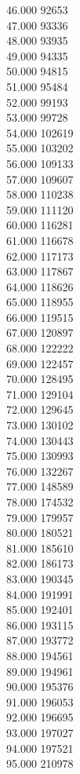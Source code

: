 { 46.000	92653 \\
 47.000	93336 \\
 48.000	93935 \\
 49.000	94335 \\
 50.000	94815 \\
 51.000	95484 \\
 52.000	99193 \\
 53.000	99728 \\
 54.000	102619 \\
 55.000	103202 \\
 56.000	109133 \\
 57.000	109607 \\
 58.000	110238 \\
 59.000	111120 \\
 60.000	116281 \\
 61.000	116678 \\
 62.000	117173 \\
 63.000	117867 \\
 64.000	118626 \\
 65.000	118955 \\
 66.000	119515 \\
 67.000	120897 \\
 68.000	122222 \\
 69.000	122457 \\
 70.000	128495 \\
 71.000	129104 \\
 72.000	129645 \\
 73.000	130102 \\
 74.000	130443 \\
 75.000	130993 \\
 76.000	132267 \\
 77.000	148589 \\
 78.000	174532 \\
 79.000	179957 \\
 80.000	180521 \\
 81.000	185610 \\
 82.000	186173 \\
 83.000	190345 \\
 84.000	191991 \\
 85.000	192401 \\
 86.000	193115 \\
 87.000	193772 \\
 88.000	194561 \\
 89.000	194961 \\
 90.000	195376 \\
 91.000	196053 \\
 92.000	196695 \\
 93.000	197027 \\
 94.000	197521 \\
 95.000	210978 \\
}
